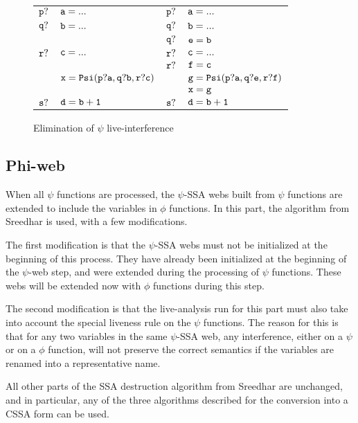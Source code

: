 \begin{figure}
\begin{center}
\footnotesize
\begin{tabular}{llll}
${\tt p?}$ & ${\tt a = ...}$ & ${\tt p?}$ & ${\tt a = ...}$ \\
${\tt q?}$ & ${\tt b = ...}$ & ${\tt q?}$ & ${\tt b = ...}$ \\
           &                 & ${\tt q?}$ & ${\tt e = b}$ \\
${\tt r?}$ & ${\tt c = ...}$ & ${\tt r?}$ & ${\tt c = ...}$ \\
           &                 & ${\tt r?}$ & ${\tt f = c}$ \\
           & ${\tt x = Psi(p?a,q?b,r?c)}$ & & ${\tt g = Psi(p?a,q?e,r?f)}$ \\
           &                 &            & ${\tt x = g}$ \\
${\tt s?}$ & ${\tt d = b+1}$ & ${\tt s?}$ & ${\tt d = b+1}$ \\
\end{tabular}
\caption{Elimination of $\psi$ live-interference}
\label{fig:live-interference}
\end{center}
\end{figure}

\subsection{Phi-web}

When all $\psi$ functions are processed, the $\psi$-SSA webs built
from $\psi$ functions are extended to include the variables in $\phi$
functions. In this part, the algorithm from Sreedhar is used, with a
few modifications.

The first modification is that the $\psi$-SSA webs must not be
initialized at the beginning of this process. They have already been
initialized at the beginning of the $\psi$-web step, and were extended
during the processing of $\psi$ functions. These webs will be extended
now with $\phi$ functions during this step.

The second modification is that the live-analysis run for this part
must also take into account the special liveness rule on the $\psi$
functions. The reason for this is that for any two variables in the
same $\psi$-SSA web, any interference, either on a $\psi$ or on a
$\phi$ function, will not preserve the correct semantics if the
variables are renamed into a representative name.

All other parts of the SSA destruction algorithm from Sreedhar are
unchanged, and in particular, any of the three algorithms described
for the conversion into a CSSA form can be used.

